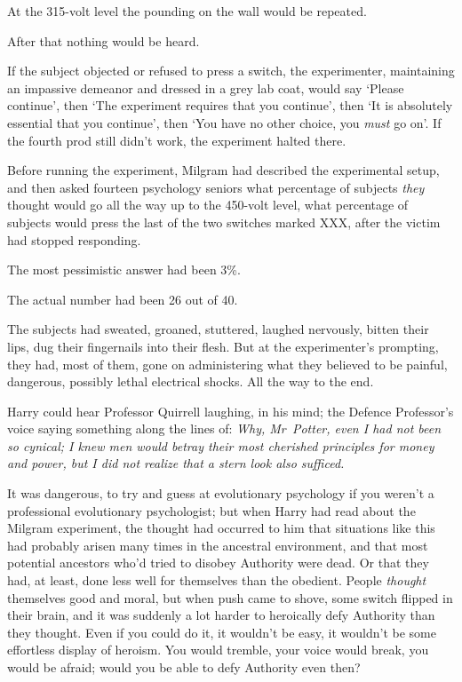 At the 315-volt level the pounding on the wall would be repeated.

After that nothing would be heard.

If the subject objected or refused to press a switch, the experimenter,
maintaining an impassive demeanor and dressed in a grey lab coat, would say
`Please continue', then `The experiment requires that you continue', then `It
is absolutely essential that you continue', then `You have no other choice, you
\emph{must} go on'. If the fourth prod still didn't work, the experiment halted
there.

Before running the experiment, Milgram had described the experimental setup,
and then asked fourteen psychology seniors what percentage of subjects
\emph{they} thought would go all the way up to the 450-volt level, what
percentage of subjects would press the last of the two switches marked XXX,
after the victim had stopped responding.

The most pessimistic answer had been 3\%.

The actual number had been 26 out of 40.

The subjects had sweated, groaned, stuttered, laughed nervously, bitten their
lips, dug their fingernails into their flesh. But at the experimenter's
prompting, they had, most of them, gone on administering what they believed to
be painful, dangerous, possibly lethal electrical shocks. All the way to the
end.

Harry could hear Professor Quirrell laughing, in his mind; the Defence
Professor's voice saying something along the lines of: \emph{Why, Mr~Potter,
even I had not been so cynical; I knew men would betray their most cherished
principles for money and power, but I did not realize that a stern look also
sufficed.}

It was dangerous, to try and guess at evolutionary psychology if you weren't a
professional evolutionary psychologist; but when Harry had read about the
Milgram experiment, the thought had occurred to him that situations like this
had probably arisen many times in the ancestral environment, and that most
potential ancestors who'd tried to disobey Authority were dead. Or that they
had, at least, done less well for themselves than the obedient. People
\emph{thought} themselves good and moral, but when push came to shove, some
switch flipped in their brain, and it was suddenly a lot harder to heroically
defy Authority than they thought. Even if you could do it, it wouldn't be easy,
it wouldn't be some effortless display of heroism. You would tremble, your
voice would break, you would be afraid; would you be able to defy Authority
even then?

